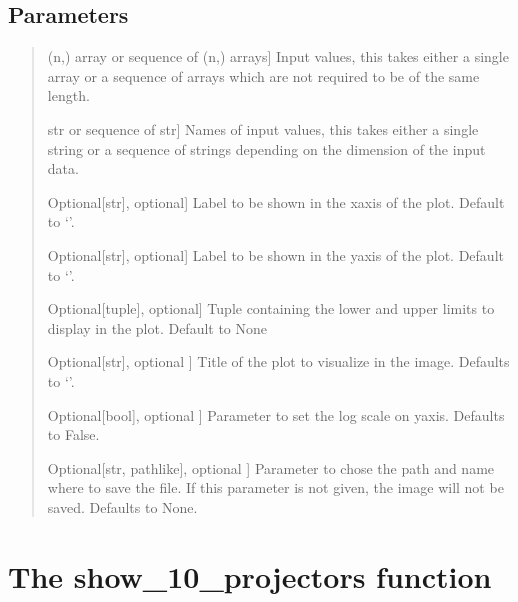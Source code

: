 \documentclass[letterpaper,10pt,english]{sphinxmanual}
\begin{document}
\begin{fulllineitems}
\subsection{Parameters}
\label{\detokenize{index:id19}}\begin{quote}
\begin{description}
\sphinxlineitem{data}{[}(n,) array or sequence of (n,) arrays{]}
\sphinxAtStartPar
Input values, this takes either a single array or a sequence of arrays 
which are not required to be of the same length.

\sphinxlineitem{label}{[}str or sequence of str{]}
\sphinxAtStartPar
Names of input values, this takes either a single string or a sequence of 
strings depending on the dimension of the input data.

\sphinxlineitem{xlabel}{[}Optional{[}str{]}, optional{]}
\sphinxAtStartPar
Label to be shown in the x\sphinxhyphen{}axis of the plot. Default to ‘’.

\sphinxlineitem{ylabel}{[}Optional{[}str{]}, optional{]}
\sphinxAtStartPar
Label to be shown in the y\sphinxhyphen{}axis of the plot. Default to ‘’.

\sphinxlineitem{xlim}{[}Optional{[}tuple{]}, optional{]}
\sphinxAtStartPar
Tuple containing the lower and upper limits to display in the plot. Default 
to None

\sphinxlineitem{title}{[}Optional{[}str{]}, optional {]}
\sphinxAtStartPar
Title of the plot to visualize in the image. Defaults to ‘’.

\sphinxlineitem{ylogscale}{[}Optional{[}bool{]}, optional {]}
\sphinxAtStartPar
Parameter to set the log scale on y\sphinxhyphen{}axis. Defaults to False.

\sphinxlineitem{savepath}{[}Optional{[}str, path\sphinxhyphen{}like{]}, optional {]}
\sphinxAtStartPar
Parameter to chose the path and name where to save the file. If this
parameter is not given, the image will not be saved. Defaults to None.

\end{description}
\end{quote}

\end{fulllineitems}



\section{The show\_10\_projectors function}
\label{\detokenize{index:the-show-10-projectors-function}}
\end{document}
